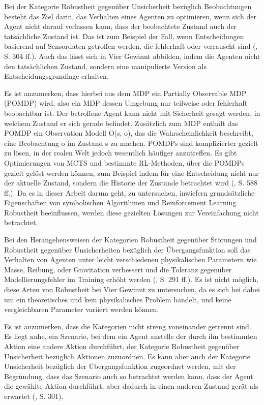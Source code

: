 Bei der Kategorie Robustheit gegenüber Unsicherheit bezüglich Beobachtungen besteht das Ziel darin, das Verhalten eines Agenten zu optimieren, wenn sich der Agent nicht darauf verlassen kann, dass der beobachtete Zustand auch der tatsächliche Zustand ist. Das ist zum Beispiel der Fall, wenn Entscheidungen basierend auf Sensordaten getroffen werden, die fehlerhaft oder verrauscht sind (\cite{Moos.2022}, S. 304 ff.). Auch das lässt sich in Vier Gewinnt abbilden, indem die Agenten nicht den tatsächlichen Zustand, sondern eine manipulierte Version als Entscheidungsgrundlage erhalten.

Es ist anzumerken, dass hierbei aus dem MDP ein Partially Observable MDP (POMDP) wird, also ein MDP dessen Umgebung nur teilweise oder fehlerhaft beobachtbar ist. Der betroffene Agent kann nicht mit Sicherheit gesagt werden, in welchem Zustand er sich gerade befindet. Zusätzlich zum MDP enthält das POMDP ein Observation Modell O(s, o), das die Wahrscheinlichkeit beschreibt, eine Beobachtung o im Zustand s zu machen. POMDPs sind komplizierter gezielt zu lösen, in der realen Welt jedoch wesentlich häufiger anzutreffen. Es gibt Optimierungen von MCTS und bestimmte RL-Methoden, über die POMDPs gezielt gelöst werden können, zum Beispiel indem für eine Entscheidung nicht nur der aktuelle Zustand, sondern die Historie der Zustände betrachtet wird (\cite{Russell.2020}, S. 588 ff.). Da es in dieser Arbeit darum geht, zu untersuchen, inwiefern grundsätzliche Eigenschaften von symbolischen Algorithmen und Reinforcement Learning Robustheit beeinflussen, werden diese gezielten Lösungen zur Vereinfachung nicht betrachtet.

Bei den Herangehensweisen der Kategorien Robustheit gegenüber Störungen und Robustheit gegenüber Unsicherheiten bezüglich der Übergangsfunktion soll das Verhalten von Agenten unter leicht verschiedenen physikalischen Parametern wie Masse, Reibung, oder Gravitation verbessert und die Toleranz gegenüber Modellierungsfehler im Training erhöht werden (\cite{Moos}, S. 291 ff.). Es ist nicht möglich, diese Arten von Robustheit bei Vier Gewinnt zu untersuchen, da es sich bei dabei um ein theoretisches und kein physikalisches Problem handelt, und keine vergleichbaren Parameter variiert werden können.

Es ist anzumerken, dass die Kategorien nicht streng voneinander getrennt sind. Es liegt nahe, ein Szenario, bei dem ein Agent anstelle der durch ihn bestimmten Aktion eine andere Aktion durchführt, der Kategorie Robustheit gegenüber Unsicherheit bezüglich Aktionen zuzuordnen. Es kann aber auch der Kategorie Unsicherheit bezüglich der Übergangsfunktion zugeordnet werden, mit der Begründung, dass das Szenario auch so betrachtet werden kann, dass der Agent die gewählte Aktion durchführt, aber dadurch in einen anderen Zustand gerät als erwartet (\cite{Moos}, S. 301).

